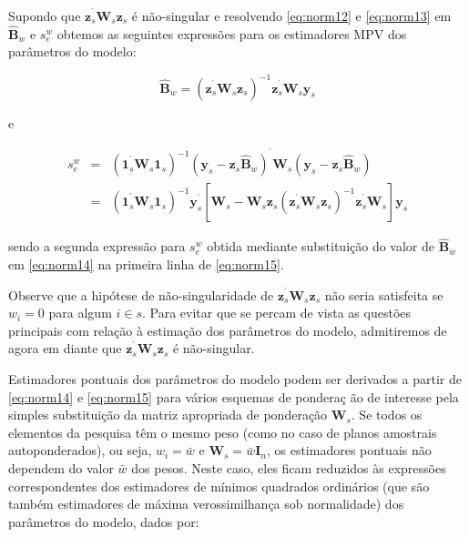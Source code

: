 \documentclass[]{book}
\numberwithin{example}{chapter}
\numberwithin{remark}{chapter}
\numberwithin{definition}{chapter}
\begin{document}
Supondo que \(\mathbf{z}_{s}^{^{\prime }}\mathbf{W}_{s}\mathbf{z}_{s}\)
é não-singular e resolvendo \eqref{eq:norm12} e \eqref{eq:norm13} em
\(\mathbf{\hat{B} }_{w}\) e \(s_{e}^{w}\) obtemos as seguintes
expressões para os estimadores MPV dos parâmetros do modelo:

\begin{equation}
\widehat{\mathbf{B}}_{w}=\left( \mathbf{z}_{s}^{^{\prime }}\mathbf{W}_{s}
\mathbf{z}_{s}\right) ^{-1}\mathbf{z}_{s}^{^{\prime }}\mathbf{W}_{s}\mathbf{y
}_{s}  \label{eq:norm14}
\end{equation}

e

\begin{eqnarray}
s_{e}^{w} &=&\left( \mathbf{1}_{s}^{^{\prime }}\mathbf{W}_{s}\mathbf{1}
_{s}\right) ^{-1}\left( \mathbf{y}_{s}-\mathbf{z}_{s}\widehat{\mathbf{B}}
_{w}\right) ^{^{\prime }}\mathbf{W}_{s}\left( \mathbf{y}_{s}-\mathbf{z}_{s}
\widehat{\mathbf{B}}_{w}\right)  \label{eq:norm15} \\
&=&\left( \mathbf{1}_{s}^{^{\prime }}\mathbf{W}_{s}\mathbf{1}_{s}\right)
^{-1}\mathbf{y}_{s}^{^{\prime }}\left[ \mathbf{W}_{s}-\mathbf{W}_{s}\mathbf{z
}_{s}\left( \mathbf{z}_{s}^{^{\prime }}\mathbf{W}_{s}\mathbf{z}_{s}\right)
^{-1}\mathbf{z}_{s}^{^{\prime }}\mathbf{W}_{s}\right] \mathbf{y}_{s} 
\nonumber
\end{eqnarray}

sendo a segunda expressão para \(s_{e}^{w}\) obtida mediante
substituição do valor de \(\widehat{\mathbf{B}}_{w}\) em \eqref{eq:norm14}
na primeira linha de \eqref{eq:norm15}.

Observe que a hipótese de não-singularidade de
\(\mathbf{z} _{s}^{^{\prime }}\mathbf{W}_{s}\mathbf{z}_{s}\) não seria
satisfeita se \(w_{i}=0\) para algum \(i\in s\). Para evitar que se
percam de vista as questões principais com relação à estimação dos
parâmetros do modelo, admitiremos de agora em diante que
\(\mathbf{z} _{s}^{^{\prime }}\mathbf{W}_{s}\mathbf{z}_{s}\) é
não-singular.

Estimadores pontuais dos parâmetros do modelo podem ser derivados a
partir de \eqref{eq:norm14} e \eqref{eq:norm15} para vários esquemas de
pondera\c{c
}ão de interesse pela simples substituição da matriz apropriada de
ponderação \(\mathbf{W}_{s}\). Se todos os elementos da pesquisa têm o
mesmo peso (como no caso de planos amostrais autoponderados), ou seja,
\(w_{i}=\bar{w}\) e \(\mathbf{W}_{s}=\bar{w}\mathbf{I}_{n}\), os
estimadores pontuais não dependem do valor \(\bar{w}\) dos pesos. Neste
caso, eles ficam reduzidos às expressões correspondentes dos estimadores
de mínimos quadrados ordinários (que são também estimadores de máxima
verossimilhança sob normalidade) dos parâmetros do modelo, dados por:
\end{document}
